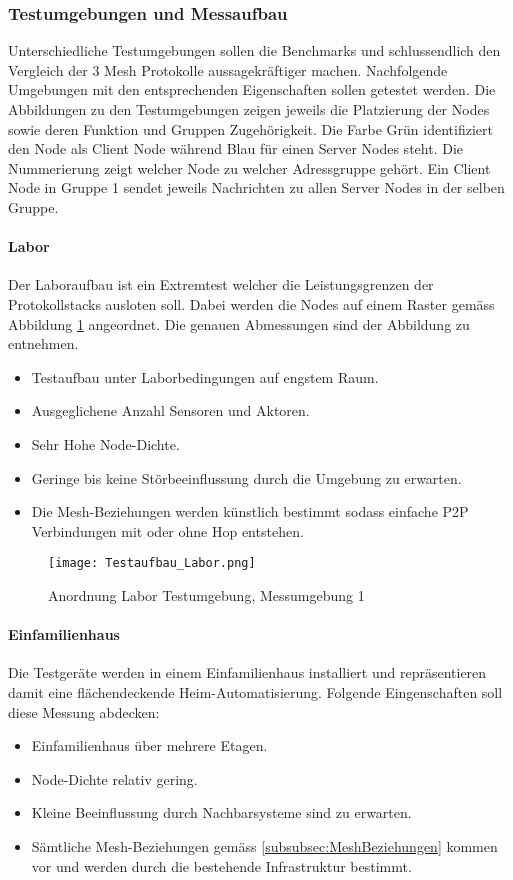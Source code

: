 \subsubsection{Testumgebungen und Messaufbau}\label{subsubsec:TestumgebungenundMessaufbau}

Unterschiedliche Testumgebungen sollen die Benchmarks und schlussendlich den Vergleich der 3 Mesh Protokolle aussagekräftiger machen.
Nachfolgende Umgebungen mit den entsprechenden Eigenschaften sollen getestet werden.
Die Abbildungen zu den Testumgebungen zeigen jeweils die Platzierung der Nodes sowie deren Funktion und Gruppen Zugehörigkeit. Die Farbe Grün identifiziert den Node als Client Node während Blau für einen Server Nodes steht. Die Nummerierung zeigt welcher Node zu welcher Adressgruppe gehört. Ein Client Node in Gruppe 1 sendet jeweils Nachrichten zu allen Server Nodes in der selben Gruppe.

\paragraph{Labor}
Der Laboraufbau ist ein Extremtest welcher die Leistungsgrenzen der Protokollstacks ausloten soll. Dabei werden die Nodes auf einem Raster gemäss Abbildung \ref{fig:AnordnungLaborTestumgebungMessumgebung1} angeordnet. Die genauen Abmessungen sind der Abbildung zu entnehmen.
\begin{itemize}
	\item Testaufbau unter Laborbedingungen auf engstem Raum.
	\item Ausgeglichene Anzahl Sensoren und Aktoren.
	\item Sehr Hohe Node-Dichte.
	\item Geringe bis keine Störbeeinflussung durch die Umgebung zu  erwarten.
	\item Die Mesh-Beziehungen werden künstlich bestimmt sodass einfache P2P Verbindungen mit oder ohne Hop entstehen.
\end{itemize}


\begin{figure}[H]
\centering
\texttt{[image: Testaufbau\_Labor.png]}
\caption{Anordnung Labor Testumgebung, Messumgebung 1}\label{fig:AnordnungLaborTestumgebungMessumgebung1}
\end{figure}

\paragraph{Einfamilienhaus}
Die Testgeräte werden in einem Einfamilienhaus installiert und repräsentieren damit eine flächendeckende Heim-Automatisierung. Folgende Eingenschaften soll diese Messung abdecken:
\begin{itemize}
	\item Einfamilienhaus über mehrere Etagen.
	\item Node-Dichte relativ gering.
	\item Kleine Beeinflussung durch Nachbarsysteme sind zu erwarten.
	\item Sämtliche Mesh-Beziehungen gemäss \ref{subsubsec:MeshBeziehungen} kommen vor und werden durch die bestehende Infrastruktur bestimmt.
\end{itemize}

